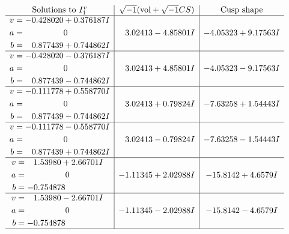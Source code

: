 \documentclass[1p]{elsarticle_modified}
\theoremstyle{definition}
\newcommand{\I}{\sqrt{-1}}
\begin{document}
$$\begin{array}{c|c|c}  
\text{Solutions to }I^v_{1}& \I (\text{vol} + \sqrt{-1}CS) & \text{Cusp shape}\\
 \hline 
\begin{aligned}
v &= -0.428020 + 0.376187 I \\
a &= \phantom{-0.000000 } 0 \\
b &= \phantom{-}0.877439 + 0.744862 I\end{aligned}
 & \phantom{-}3.02413 - 4.85801 I & -4.05323 + 9.17563 I \\ \hline\begin{aligned}
v &= -0.428020 - 0.376187 I \\
a &= \phantom{-0.000000 } 0 \\
b &= \phantom{-}0.877439 - 0.744862 I\end{aligned}
 & \phantom{-}3.02413 + 4.85801 I & -4.05323 - 9.17563 I \\ \hline\begin{aligned}
v &= -0.111778 + 0.558770 I \\
a &= \phantom{-0.000000 } 0 \\
b &= \phantom{-}0.877439 - 0.744862 I\end{aligned}
 & \phantom{-}3.02413 + 0.79824 I & -7.63258 + 1.54443 I \\ \hline\begin{aligned}
v &= -0.111778 - 0.558770 I \\
a &= \phantom{-0.000000 } 0 \\
b &= \phantom{-}0.877439 + 0.744862 I\end{aligned}
 & \phantom{-}3.02413 - 0.79824 I & -7.63258 - 1.54443 I \\ \hline\begin{aligned}
v &= \phantom{-}1.53980 + 2.66701 I \\
a &= \phantom{-0.000000 } 0 \\
b &= -0.754878\phantom{ +0.000000I}\end{aligned}
 & -1.11345 + 2.02988 I & -15.8142 + 4.6579 I \\ \hline\begin{aligned}
v &= \phantom{-}1.53980 - 2.66701 I \\
a &= \phantom{-0.000000 } 0 \\
b &= -0.754878\phantom{ +0.000000I}\end{aligned}
 & -1.11345 - 2.02988 I & -15.8142 - 4.6579 I\\
 \hline 
 \end{array}$$\newpage
\end{document}
